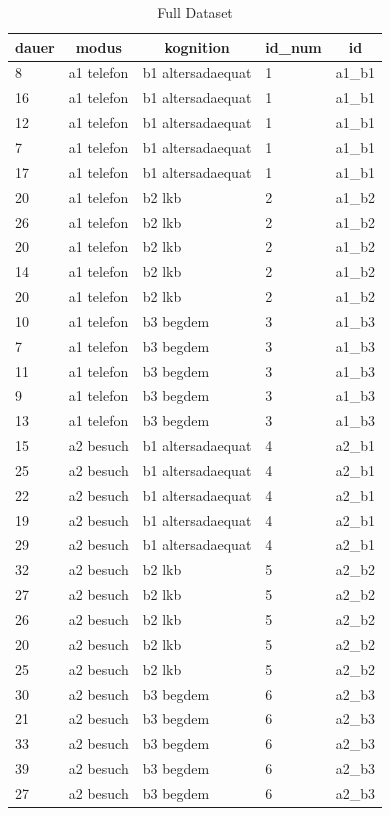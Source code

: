 \documentclass[
  doc,floatsintext]{apa6}
\begin{document}
\begin{table}[tbp]

\begin{center}
\begin{threeparttable}

\caption{\label{tab:tabinspect}Full Dataset}

\begin{tabular}{lllll}
\toprule
dauer & \multicolumn{1}{c}{modus} & \multicolumn{1}{c}{kognition} & \multicolumn{1}{c}{id\_num} & \multicolumn{1}{c}{id}\\
\midrule
8 & a1 telefon & b1 altersadaequat & 1 & a1\_b1\\
16 & a1 telefon & b1 altersadaequat & 1 & a1\_b1\\
12 & a1 telefon & b1 altersadaequat & 1 & a1\_b1\\
7 & a1 telefon & b1 altersadaequat & 1 & a1\_b1\\
17 & a1 telefon & b1 altersadaequat & 1 & a1\_b1\\
20 & a1 telefon & b2 lkb & 2 & a1\_b2\\
26 & a1 telefon & b2 lkb & 2 & a1\_b2\\
20 & a1 telefon & b2 lkb & 2 & a1\_b2\\
14 & a1 telefon & b2 lkb & 2 & a1\_b2\\
20 & a1 telefon & b2 lkb & 2 & a1\_b2\\
10 & a1 telefon & b3 begdem & 3 & a1\_b3\\
7 & a1 telefon & b3 begdem & 3 & a1\_b3\\
11 & a1 telefon & b3 begdem & 3 & a1\_b3\\
9 & a1 telefon & b3 begdem & 3 & a1\_b3\\
13 & a1 telefon & b3 begdem & 3 & a1\_b3\\
15 & a2 besuch & b1 altersadaequat & 4 & a2\_b1\\
25 & a2 besuch & b1 altersadaequat & 4 & a2\_b1\\
22 & a2 besuch & b1 altersadaequat & 4 & a2\_b1\\
19 & a2 besuch & b1 altersadaequat & 4 & a2\_b1\\
29 & a2 besuch & b1 altersadaequat & 4 & a2\_b1\\
32 & a2 besuch & b2 lkb & 5 & a2\_b2\\
27 & a2 besuch & b2 lkb & 5 & a2\_b2\\
26 & a2 besuch & b2 lkb & 5 & a2\_b2\\
20 & a2 besuch & b2 lkb & 5 & a2\_b2\\
25 & a2 besuch & b2 lkb & 5 & a2\_b2\\
30 & a2 besuch & b3 begdem & 6 & a2\_b3\\
21 & a2 besuch & b3 begdem & 6 & a2\_b3\\
33 & a2 besuch & b3 begdem & 6 & a2\_b3\\
39 & a2 besuch & b3 begdem & 6 & a2\_b3\\
27 & a2 besuch & b3 begdem & 6 & a2\_b3\\
\bottomrule
\end{tabular}


\end{threeparttable}
\end{center}
\end{table}
\end{document}
